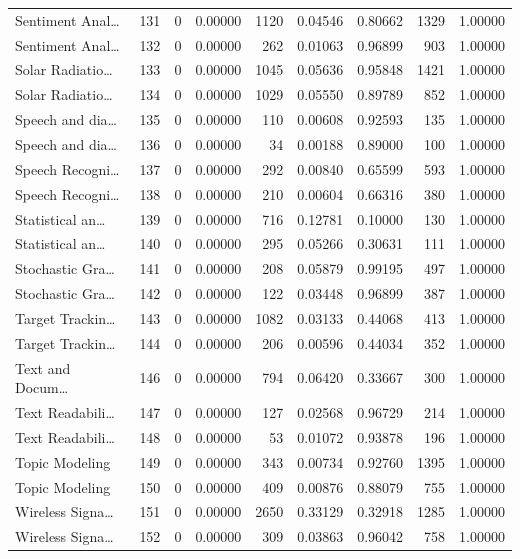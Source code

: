 \begin{table}
\begin{tabular}{lrrrrrrrr}
Sentiment Anal… & 131 & 0 & 0.00000 & 1120 & 0.04546 & 0.80662 & 1329 & 1.00000 \\
Sentiment Anal… & 132 & 0 & 0.00000 & 262 & 0.01063 & 0.96899 & 903 & 1.00000 \\
Solar Radiatio… & 133 & 0 & 0.00000 & 1045 & 0.05636 & 0.95848 & 1421 & 1.00000 \\
Solar Radiatio… & 134 & 0 & 0.00000 & 1029 & 0.05550 & 0.89789 & 852 & 1.00000 \\
Speech and dia… & 135 & 0 & 0.00000 & 110 & 0.00608 & 0.92593 & 135 & 1.00000 \\
Speech and dia… & 136 & 0 & 0.00000 & 34 & 0.00188 & 0.89000 & 100 & 1.00000 \\
Speech Recogni… & 137 & 0 & 0.00000 & 292 & 0.00840 & 0.65599 & 593 & 1.00000 \\
Speech Recogni… & 138 & 0 & 0.00000 & 210 & 0.00604 & 0.66316 & 380 & 1.00000 \\
Statistical an… & 139 & 0 & 0.00000 & 716 & 0.12781 & 0.10000 & 130 & 1.00000 \\
Statistical an… & 140 & 0 & 0.00000 & 295 & 0.05266 & 0.30631 & 111 & 1.00000 \\
Stochastic Gra… & 141 & 0 & 0.00000 & 208 & 0.05879 & 0.99195 & 497 & 1.00000 \\
Stochastic Gra… & 142 & 0 & 0.00000 & 122 & 0.03448 & 0.96899 & 387 & 1.00000 \\
Target Trackin… & 143 & 0 & 0.00000 & 1082 & 0.03133 & 0.44068 & 413 & 1.00000 \\
Target Trackin… & 144 & 0 & 0.00000 & 206 & 0.00596 & 0.44034 & 352 & 1.00000 \\
Text and Docum… & 146 & 0 & 0.00000 & 794 & 0.06420 & 0.33667 & 300 & 1.00000 \\
Text Readabili… & 147 & 0 & 0.00000 & 127 & 0.02568 & 0.96729 & 214 & 1.00000 \\
Text Readabili… & 148 & 0 & 0.00000 & 53 & 0.01072 & 0.93878 & 196 & 1.00000 \\
Topic Modeling & 149 & 0 & 0.00000 & 343 & 0.00734 & 0.92760 & 1395 & 1.00000 \\
Topic Modeling & 150 & 0 & 0.00000 & 409 & 0.00876 & 0.88079 & 755 & 1.00000 \\
Wireless Signa… & 151 & 0 & 0.00000 & 2650 & 0.33129 & 0.32918 & 1285 & 1.00000 \\
Wireless Signa… & 152 & 0 & 0.00000 & 309 & 0.03863 & 0.96042 & 758 & 1.00000 \\
\bottomrule
\end{tabular}
\end{table}
